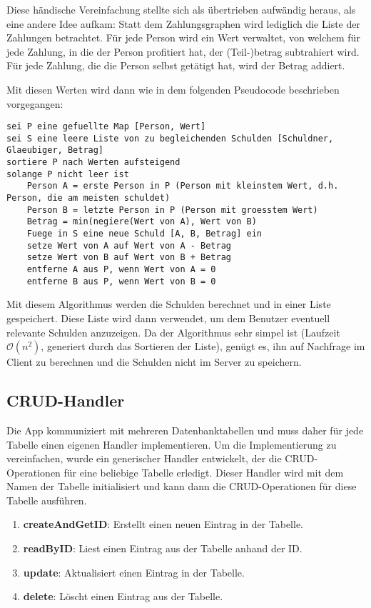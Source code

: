 Diese händische Vereinfachung stellte sich als übertrieben aufwändig heraus, als eine andere Idee aufkam:
Statt dem Zahlungsgraphen wird lediglich die Liste der Zahlungen betrachtet.
Für jede Person wird ein Wert verwaltet, von welchem für jede Zahlung, in die der Person profitiert hat, der (Teil-)betrag subtrahiert wird.
Für jede Zahlung, die die Person selbst getätigt hat, wird der Betrag addiert. 

Mit diesen Werten wird dann wie in dem folgenden Pseudocode beschrieben vorgegangen:

\begin{lstlisting}
sei P eine gefuellte Map [Person, Wert]
sei S eine leere Liste von zu begleichenden Schulden [Schuldner, Glaeubiger, Betrag]
sortiere P nach Werten aufsteigend
solange P nicht leer ist
    Person A = erste Person in P (Person mit kleinstem Wert, d.h. Person, die am meisten schuldet)
    Person B = letzte Person in P (Person mit groesstem Wert)
    Betrag = min(negiere(Wert von A), Wert von B)
    Fuege in S eine neue Schuld [A, B, Betrag] ein
    setze Wert von A auf Wert von A - Betrag
    setze Wert von B auf Wert von B + Betrag
    entferne A aus P, wenn Wert von A = 0
    entferne B aus P, wenn Wert von B = 0
\end{lstlisting}

Mit diesem Algorithmus werden die Schulden berechnet und in einer Liste gespeichert.
Diese Liste wird dann verwendet, um dem Benutzer eventuell relevante Schulden anzuzeigen.
Da der Algorithmus sehr simpel ist (Laufzeit $\mathcal{O}(n^2)$, generiert durch das Sortieren der Liste), genügt es, ihn auf Nachfrage im Client zu berechnen und die Schulden nicht im Server zu speichern.

\subsection{CRUD-Handler}

Die App kommuniziert mit mehreren Datenbanktabellen und muss daher für jede Tabelle einen eigenen Handler implementieren.
Um die Implementierung zu vereinfachen, wurde ein generischer Handler entwickelt, der die CRUD-Operationen für eine beliebige Tabelle erledigt.
Dieser Handler wird mit dem Namen der Tabelle initialisiert und kann dann die CRUD-Operationen für diese Tabelle ausführen.

\begin{enumerate}
    \item \textbf{createAndGetID}: Erstellt einen neuen Eintrag in der Tabelle.
    \item \textbf{readByID}: Liest einen Eintrag aus der Tabelle anhand der ID.
    \item \textbf{update}: Aktualisiert einen Eintrag in der Tabelle.
    \item \textbf{delete}: Löscht einen Eintrag aus der Tabelle.
\end{enumerate}

